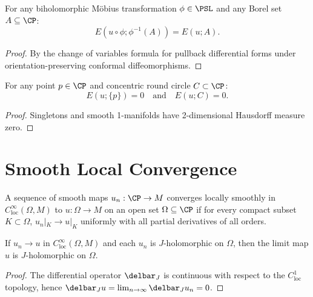 \begin{theorem}
\label{thm:energy_conformal_invariant}
\leanok
{}
For any biholomorphic Möbius transformation $\phi \in \PSL$ and any Borel set $A \subseteq \CP$:
\[
E(u \circ \phi; \phi^{-1}(A)) = E(u; A).
\]
\end{theorem}
\begin{proof}
\leanok
By the change of variables formula for pullback differential forms under orientation-preserving conformal diffeomorphisms.
\end{proof}

\begin{theorem}
\label{thm:energy_null_sets}
\leanok
{}
For any point $p \in \CP$ and concentric round circle $C \subset \CP$:
\[
E(u; \{p\}) = 0 \quad \text{and} \quad E(u; C) = 0.
\]
\end{theorem}
\begin{proof}
\leanok
Singletons and smooth 1-manifolds have 2-dimensional Hausdorff measure zero.
\end{proof}

\section{Smooth Local Convergence}

\begin{definition}
\label{f04:smooth_local_convergence}
\leanok
{}
A sequence of smooth maps $u_n : \CP \to M$ converges locally smoothly in $C^\infty_{\mathrm{loc}}(\Omega, M)$ to $u : \Omega \to M$ on an open set $\Omega \subseteq \CP$ if for every compact subset $K \subset \Omega$, $u_n|_K \to u|_K$ uniformly with all partial derivatives of all orders.
\end{definition}

\begin{theorem}
\label{thm:smooth_local_jhol_closure}
\leanok
{}
If $u_n \to u$ in $C^\infty_{\mathrm{loc}}(\Omega, M)$ and each $u_n$ is $J$-holomorphic on $\Omega$, then the limit map $u$ is $J$-holomorphic on $\Omega$.
\end{theorem}
\begin{proof}
\leanok
The differential operator $\delbar_J$ is continuous with respect to the $C^1_{\mathrm{loc}}$ topology, hence $\delbar_J u = \lim_{n \to \infty} \delbar_J u_n = 0$.
\end{proof}

